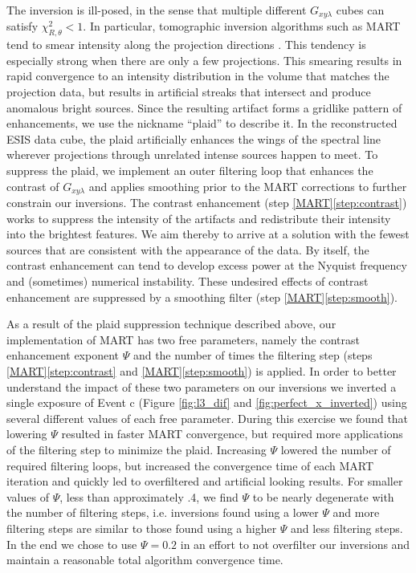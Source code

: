 	
    The inversion is ill-posed, in the sense that multiple different $G_{xy\lambda}$ cubes can satisfy $\chi_{R,\theta}^2<1$. 
    In particular, tomographic inversion algorithms such as MART tend to smear intensity along the projection directions \citep{KakSlaney2001}. 
    This tendency is especially strong when there are only a few projections. 
    This smearing results in rapid convergence to an intensity distribution in the volume that matches the projection data, but results in artificial streaks that intersect and produce anomalous bright sources. 
    Since the resulting artifact forms a gridlike pattern of enhancements, we use the nickname ``plaid'' to describe it. 
    In the reconstructed ESIS data cube, the plaid artificially enhances the wings of the spectral line wherever projections through unrelated intense sources happen to meet. 
    To suppress the plaid, we implement an outer filtering loop that enhances the contrast of $G_{xy\lambda}$ and applies smoothing prior to the MART corrections to further constrain our inversions. 
    The contrast enhancement (step \ref{MART}\ref{step:contrast}) works to suppress the intensity of the artifacts and redistribute their intensity into the brightest features. 
    We aim thereby to arrive at a solution with the fewest sources that are consistent with the appearance of the data. 
    By itself, the contrast enhancement can tend to develop excess power at the Nyquist frequency and (sometimes) numerical instability. 
    These undesired effects of contrast enhancement are suppressed by a smoothing filter (step \ref{MART}\ref{step:smooth}).
    
    As a result of the plaid suppression technique described above, our implementation of MART has two free parameters, namely the contrast enhancement exponent $\Psi$ and the number of times the filtering step (steps \ref{MART}\ref{step:contrast} and \ref{MART}\ref{step:smooth}) is applied.
    In order to better understand the impact of these two parameters on our inversions we inverted a single exposure of Event c (Figure \ref{fig:l3_dif} and \ref{fig:perfect_x_inverted}) using several different values of each free parameter.
    During this exercise we found that lowering $\Psi$ resulted in faster MART convergence, but required more applications of the filtering step to minimize the plaid.
    Increasing $\Psi$ lowered the number of required filtering loops, but increased the convergence time of each MART iteration and quickly led to overfiltered and artificial looking results.
    For smaller values of $\Psi$, less than approximately .4, we find $\Psi$ to be nearly degenerate with the number of filtering steps, i.e. inversions found using a lower $\Psi$ and more filtering steps are similar to those found using a higher $\Psi$ and less filtering steps.
    In the end we chose to use $\Psi=0.2$ in an effort to not overfilter our inversions and maintain a reasonable total algorithm convergence time. 
    
